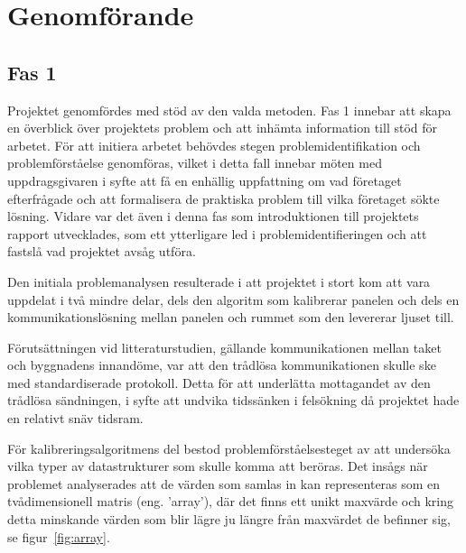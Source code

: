 \section{Genomförande} %
\label{sec:genomf_rande}
    \subsection{Fas 1} %
    \label{sub:steg_1}
        Projektet genomfördes med stöd av den valda metoden. Fas 1 innebar att skapa en överblick över projektets problem och att inhämta information till stöd för arbetet.
        För att initiera arbetet behövdes stegen problemidentifikation och problemförståelse genomföras, vilket i detta fall innebar möten med uppdragsgivaren i syfte att få en enhällig uppfattning om vad företaget efterfrågade och att formalisera de praktiska problem till vilka företaget sökte lösning. Vidare var det även i denna fas som introduktionen till projektets rapport utvecklades, som ett ytterligare led i problemidentifieringen och att fastslå vad projektet avsåg utföra. \bigskip

        Den initiala problemanalysen resulterade i att projektet i stort kom att vara uppdelat i två mindre delar, dels den algoritm som kalibrerar panelen och dels en kommunikationslösning mellan panelen och rummet som den levererar ljuset till. \bigskip

        Förutsättningen vid litteraturstudien, gällande kommunikationen mellan taket och byggnadens innandöme, var att den trådlösa kommunikationen skulle ske med standardiserade protokoll. Detta för att underlätta mottagandet av den trådlösa sändningen, i syfte att undvika tidssänken i felsökning då projektet hade en relativt snäv tidsram.\bigskip

        För kalibreringsalgoritmens del bestod problemförståelsesteget av att undersöka vilka typer av datastrukturer som skulle komma att beröras. Det insågs när problemet analyserades att de värden som samlas in kan representeras som en tvådimensionell matris (eng. 'array'), där det finns ett unikt maxvärde och kring detta minskande värden som blir lägre ju längre från maxvärdet de befinner sig, se figur~\ref{fig:array}. \bigskip

